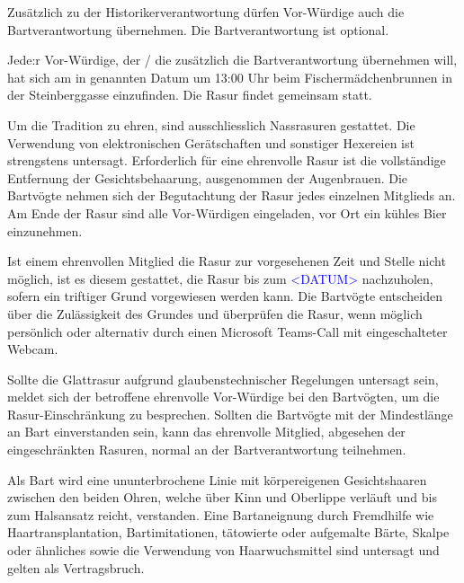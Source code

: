 \documentclass[fontsize=12pt,parskip=half]{scrartcl}
\begin{document}
\begin{contract}
  \Clause[title={Bartverantwortung}]\label{B.verantwortung}
  Zusätzlich zu der Historikerverantwortung  dürfen Vor-Würdige auch die Bartverantwortung übernehmen. Die Bartverantwortung ist
  optional.

  \Clause[title={Letzte Rasur}]\label{B.lastrasur}
  Jede:r Vor-Würdige, der / die zusätzlich die Bartverantwortung übernehmen will, hat sich am in  genannten Datum um 13:00 Uhr
  beim Fischermädchenbrunnen in der Steinberggasse einzufinden.
  Die Rasur findet gemeinsam statt.

  \SubClause[title={Durchführung der Rasur}]\label{B.durchfuehrung}
  Um die Tradition zu ehren, sind ausschliesslich Nassrasuren gestattet. Die Verwendung von
  elektronischen Gerätschaften und sonstiger Hexereien ist strengstens untersagt. Erforderlich für eine
  ehrenvolle Rasur ist die vollständige Entfernung der Gesichtsbehaarung, ausgenommen der
  Augenbrauen. Die Bartvögte nehmen sich der Begutachtung der Rasur jedes einzelnen Mitglieds
  an.
  \SubClause[title={Anschliessende Kehlenbefeuchtung}]
  Am Ende der Rasur sind alle Vor-Würdigen eingeladen, vor Ort ein kühles Bier einzunehmen.

  \SubClause[title={Rasurverzug}]
  Ist einem ehrenvollen Mitglied die Rasur zur vorgesehenen Zeit und Stelle nicht möglich,
  ist es diesem gestattet, die Rasur bis zum \textcolor{blue}{<DATUM>} nachzuholen, sofern ein triftiger
  Grund vorgewiesen werden kann. Die Bartvögte entscheiden über die Zulässigkeit des Grundes
  und überprüfen die Rasur, wenn möglich persönlich oder alternativ durch einen
  Microsoft Teams-Call mit eingeschalteter Webcam.

  \SubClause[title={Glaubensklausel (Shamess Klausel)}]
  Sollte die Glattrasur aufgrund glaubenstechnischer Regelungen untersagt sein, meldet sich
  der betroffene ehrenvolle Vor-Würdige bei den Bartvögten, um die Rasur-Einschränkung zu
  besprechen. Sollten die Bartvögte mit der Mindestlänge an Bart einverstanden sein,
  kann das ehrenvolle Mitglied, abgesehen der eingeschränkten Rasuren, normal
  an der Bartverantwortung teilnehmen.

  \Clause[title={Bartvorschriften}]
  \SubClause[title={Definition Bart}]
  Als Bart wird eine ununterbrochene Linie mit körpereigenen Gesichtshaaren zwischen den beiden Ohren,
  welche über Kinn und Oberlippe verläuft und bis zum Halsansatz reicht, verstanden. Eine Bartaneignung
  durch Fremdhilfe wie Haartransplantation, Bartimitationen, tätowierte oder aufgemalte Bärte,
  Skalpe oder ähnliches sowie die Verwendung von Haarwuchsmittel sind untersagt und gelten als Vertragsbruch.


\end{contract}
\end{document}
